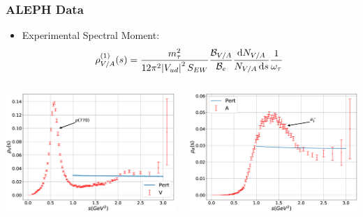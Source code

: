 \documentclass{beamer}
\begin{document}
\begin{frame}
  \frametitle{ALEPH Data}
  \begin{itemize}
    \item Experimental Spectral Moment:
      \begin{equation}
        \rho^{(1)}_{V/A}(s) = \frac{m_\tau^2}{12 \pi^2 \abs{V_{ud}}^2 S_{EW}} \frac{\mathcal{B}_{V/A}}{\mathcal{B}_e} \frac{\dif N_{V/A}}{N_{V/A}\dif s}
        \frac{1}{\omega_\tau}
      \end{equation}
  \end{itemize}

  \vfill

  \begin{columns}
    \begin{column}{0.5\textwidth}
      \includegraphics[width=\textwidth]{./images/specFuncAleph_V.eps}
    \end{column}
    \begin{column}{0.5\textwidth}
      \includegraphics[width=\textwidth]{./images/specFuncAleph_A.eps}
    \end{column}
  \end{columns}
\end{frame}
\end{document}
